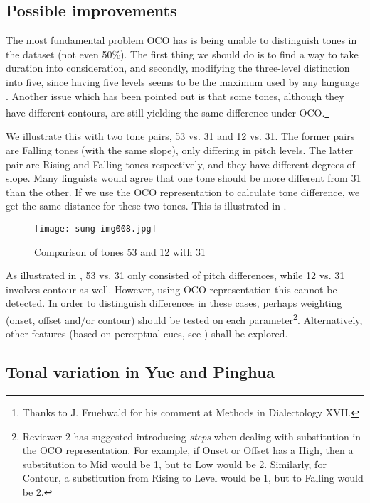 \documentclass[output=paper, chinesefont]{langscibook}
\begin{document}
\subsection{Possible improvements}
\label{sec:sung:6.3}
The most fundamental problem OCO has is being unable to distinguish tones in the dataset (not even 50\%). The first thing we should do is to find a way to take duration into consideration, and secondly, modifying the three-level distinction into five, since having five levels seems to be the maximum used by any language \citep[20]{Yip2002}. Another issue which has been pointed out is that some tones, although they have different contours, are still yielding the same difference under OCO.\footnote{Thanks to J. Fruehwald for his comment at Methods in Dialectology XVII.} 

We illustrate this with two tone pairs, 53 vs. 31 and 12 vs. 31. The former pairs are Falling tones (with the same slope), only differing in pitch levels. The latter pair are Rising and Falling tones respectively, and they have different degrees of slope. Many linguists would agree that one tone should be more different from 31 than the other. If we use the OCO representation to calculate tone difference, we get the same distance for these two tones. This is illustrated in .

  
\begin{figure}
\texttt{[image: sung-img008.jpg]}
\caption{Comparison of tones 53 and 12 with 31}
\label{fig:sung:8}
\end{figure}

As illustrated in , 53 vs. 31 only consisted of pitch differences, while 12 vs. 31 involves contour as well. However, using OCO representation this cannot be detected. In order to distinguish differences in these cases, perhaps weighting (onset, offset and/or contour) should be tested on each parameter\footnote{Reviewer 2 has suggested introducing \textit{steps} when dealing with substitution in the OCO representation. For example, if Onset or Offset has a High, then a substitution to Mid would be 1, but to Low would be 2. Similarly, for Contour, a substitution from Rising to Level would be 1, but to Falling would be 2.}. Alternatively, other features (based on perceptual cues, see \citealt{GandourHarshman1978}) shall be explored.

\subsection{Tonal variation in Yue and Pinghua}\label{sec:sung:6.4}
\end{document}
